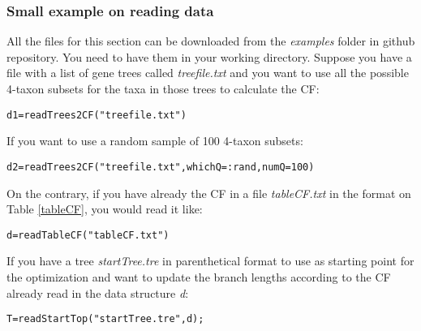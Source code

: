 \documentclass[12pt]{article}
\begin{document}
\subsubsection{Small example on reading data}
\label{readDataEx}
All the files for this section can be downloaded from the
\textit{examples} folder in github repository. You need to have them
in your working directory.
Suppose you have a file with a list of gene trees called
\textit{treefile.txt} and you want to use all the possible 4-taxon subsets for the
taxa in those trees to calculate the CF:
\begin{lstlisting}
d1=readTrees2CF("treefile.txt")
\end{lstlisting}
If you want to use a random sample of 100 4-taxon subsets:
\begin{lstlisting}
d2=readTrees2CF("treefile.txt",whichQ=:rand,numQ=100)
\end{lstlisting}
On the contrary, if you have already the CF in a file \textit{tableCF.txt}
in the format on Table \ref{tableCF}, you
would read it like:
\begin{lstlisting}
d=readTableCF("tableCF.txt")
\end{lstlisting}
If you have a tree \textit{startTree.tre} in parenthetical format to
use as starting point for the optimization and want to
update the branch lengths according to the CF already read in the data
structure \textit{d}:
\begin{lstlisting}
T=readStartTop("startTree.tre",d);
\end{lstlisting}
\end{document}
